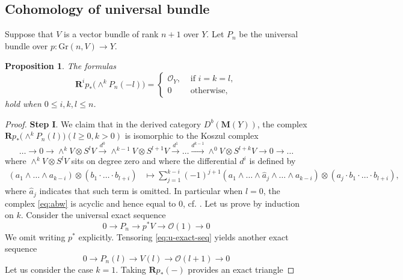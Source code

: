 \documentclass[a4paper]{amsart}
\theoremstyle{plain}
\newtheorem{proposition}[theorem]{Proposition}
\theoremstyle{definition}
\numberwithin{equation}{section}
\newcommand{\M}{\mathbf{M}}
\newcommand{\Gr}{\mathrm{Gr}}
\newcommand{\SO}{\mathcal{O}}
\begin{document}
\subsection{Cohomology of universal bundle}
Suppose that ${V }$ is a vector bundle of rank $n+1$ over $Y$. Let ${P }_n$ be the universal bundle over $p: \Gr(n,{V }) \to Y$.
\begin{proposition}\label{lma:gr_uni_wedge}
    The formulas
    \[
        \mathbf{R}^{i}p_* \big(\wedge^{k}{P }_n(-l)\big) = \begin{cases}
            \SO_Y, & \text{ if } i=k=l, \\
            0      & \text{ otherwise,}
        \end{cases}
    \]
    hold when $0\leq i,k,l \leq n$.
\end{proposition}
\begin{proof}
    \textbf{Step I}. We claim that in the derived category $D^b(\M(Y))$, the complex $\mathbf{R}p_* \big(\wedge^{k}{P }_n(l)\big) (l\geq 0, k >0)$ is isomorphic to the Koszul complex
    \begin{equation}\label{eq:abw}
        \ldots \to 0 \to \wedge^{k}{V } \otimes S^{l}{V } \xrightarrow{d^0} \wedge^{k-1}{V } \otimes S^{l+1}{V } \xrightarrow{d^1} \ldots \xrightarrow{d^{k-1}} \wedge^{0}{V } \otimes S^{l+k}{V } \to 0 \to \ldots
    \end{equation}
    where $\wedge^{k}{V } \otimes S^{l}{V } $ sits on degree zero and where the differential $d^i$ is defined by
    \[
        \begin{aligned}
            (a_{1} \wedge \ldots \wedge a_{k-i})\otimes (b_{1} \cdot \ldots \cdot b_{l+i}) & \mapsto \sum_{j=1}^{k-i} (-1)^{j+1} (a_{1} \wedge \ldots \wedge \widehat{a}_{j} \wedge  \ldots \wedge a_{k-i}) \otimes (a_{j} \cdot b_{1} \cdot \ldots \cdot b_{l+i}),
        \end{aligned}
    \]
    where $\widehat{a}_{j}$ indicates that such term is omitted. In particular when $l=0$, the complex \eqref{eq:abw} is acyclic and hence equal to $0$, cf. \cite[Corollary V.1.15 and p.263]{akin1982schur}. Let us prove by induction on $k$. Consider the universal exact sequence
    \begin{equation}\label{eq:u-exact-seq}
        0\to {P }_n \to p^*{V } \to \SO(1) \to 0
    \end{equation}
    We omit writing $p^*$ explicitly. Tensoring \ref{eq:u-exact-seq} yields another exact sequence
    \[
        0 \to {P }_n(l) \to {V }(l) \to \SO(l+1) \to 0
    \]
    Let us consider the case $k=1$. Taking $\mathbf{R}p_*(-)$ provides an exact triangle

\end{proof}
\end{document}
